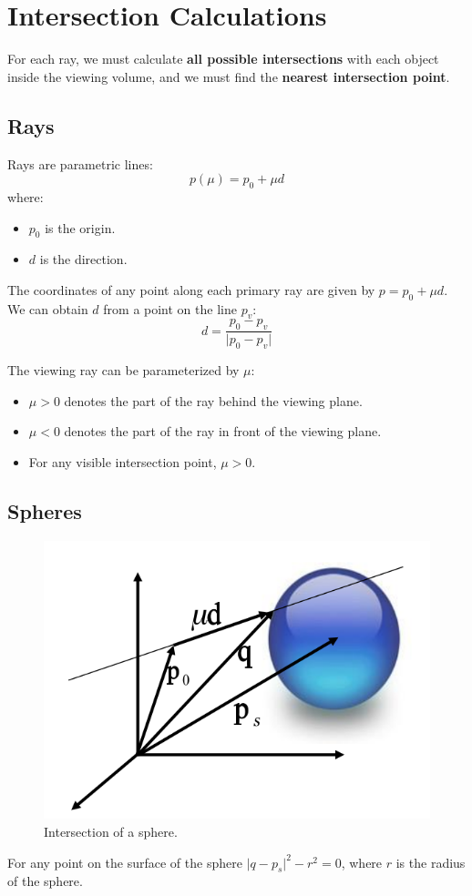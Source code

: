 \documentclass[11pt]{article}
\begin{document}
\section{Intersection Calculations}
For each ray, we must calculate \textbf{all possible intersections} with each object inside the viewing volume, and we must find the \textbf{nearest intersection point}.

\subsection{Rays}
Rays are parametric lines:
\[
  p(\mu) = p_0 + \mu d 
\]
where:
\begin{itemize}
  \item $p_0$ is the origin.
  \item $d$ is the direction.
\end{itemize}

The coordinates of any point along each primary ray are given by $p = p_0 + \mu d$.
We can obtain $d$ from a point on the line $p_v$:
\[
  d = \frac{p_0 - p_v}{\lvert p_0 - p_v \rvert} 
\]

The viewing ray can be parameterized by $\mu$:
\begin{itemize}
  \item $\mu > 0$ denotes the part of the ray behind the viewing plane.
  \item $\mu < 0$ denotes the part of the ray in front of the viewing plane.
  \item For any visible intersection point, $\mu > 0$.
\end{itemize}

\subsection{Spheres}
\begin{figure}[htb!]
  \centering
  \caption{Intersection of a sphere.}
  \includegraphics[scale=0.5]{sphereintersection}
\end{figure}
For any point on the surface of the sphere $\lvert q - p_s \rvert ^2 - r^2 = 0$, where
$r$ is the radius of the sphere.
\end{document}
